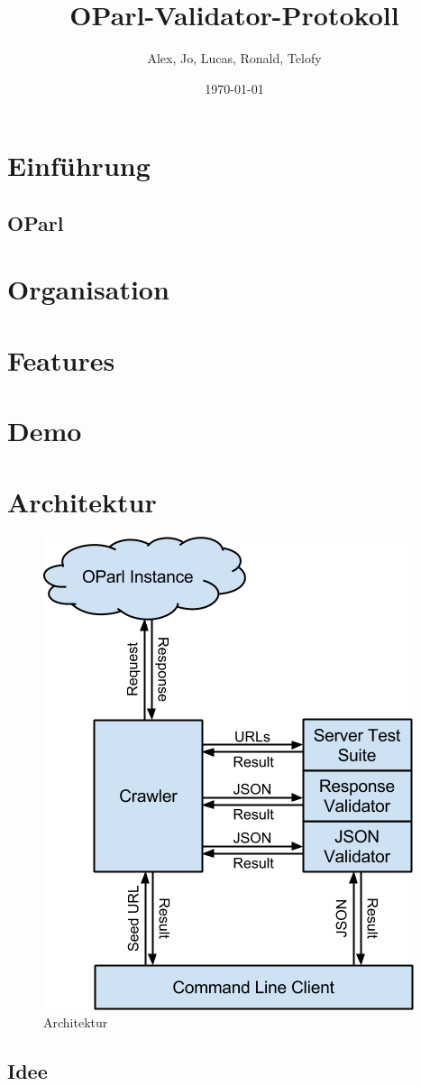 \documentclass[12pt, fleqn]{scrartcl}
\title{OParl-Validator-Protokoll}
\author{Alex, Jo, Lucas, Ronald, Telofy}
\date{\today}
\begin{document}
\Maketitle

\section{Einführung}

\subsection{OParl}



\section{Organisation}
\section{Features}
\section{Demo}
\section{Architektur}

\begin{figure}
  \begin{center}
    \includegraphics[width=.5\textwidth]{architecture.final.png}
  \end{center}
  \caption{Architektur}
\end{figure}

\subsection{Idee}
\end{document}
